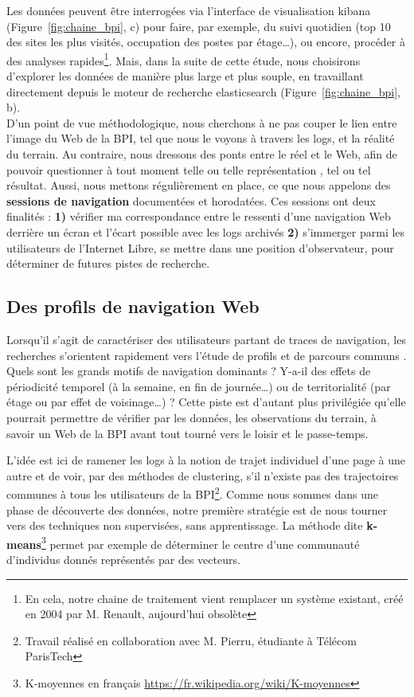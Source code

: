 \documentclass[symmetric,justified,marginals=raggedouter]{tufte-book}
\begin{document}
Les données peuvent être interrogées via l'interface de visualisation kibana (Figure~\ref{fig:chaine_bpi}, c) pour faire, par exemple, du suivi quotidien (top 10 des sites les plus visités, occupation des postes par étage\ldots{}), ou encore, procéder à des analyses rapides\footnote{\RaggedOuter En cela, notre chaine de traitement vient remplacer un système existant, créé en 2004 par M. Renault, aujourd'hui obsolète}. Mais, dans la suite de cette étude, nous choisirons d'explorer les données de manière plus large et plus souple, en travaillant directement depuis le moteur de recherche elasticsearch (Figure~\ref{fig:chaine_bpi}, b). \\

\noindent D'un point de vue méthodologique, nous cherchons à ne pas couper le lien entre l'image du Web de la BPI, tel que nous le voyons à travers les logs, et la réalité du terrain. Au contraire, nous dressons des ponts entre le réel et le Web, afin de pouvoir questionner à tout moment telle ou telle représentation , tel ou tel résultat. Aussi, nous mettons régulièrement en place, ce que nous appelons des \textbf{sessions de navigation} documentées et horodatées. Ces sessions ont deux finalités : \textbf{1)} vérifier ma correspondance entre le ressenti d'une navigation Web derrière un écran et l'écart possible avec les logs archivés \textbf{2)} s'immerger parmi les utilisateurs de l'Internet Libre, se mettre dans une position d'observateur, pour déterminer de futures pistes de recherche.

\subsection{Des profils de navigation Web} 

\noindent Lorsqu'il s'agit de caractériser des utilisateurs partant de traces de navigation, les recherches s'orientent rapidement vers l'étude de profils et de parcours communs \citep{feng_web_2006}. Quels sont les grands motifs de navigation dominants ? Y-a-il des effets de périodicité temporel (à la semaine, en fin de journée\ldots{}) ou de territorialité (par étage ou par effet de voisinage\ldots{}) ? Cette piste est d'autant plus privilégiée qu'elle pourrait permettre de vérifier par les données, les observations du terrain, à savoir un Web de la BPI avant tout tourné vers le loisir et le passe-temps.

L'idée est ici de ramener les logs à la notion de trajet individuel d'une page à une autre et de voir, par des méthodes de clustering, s'il n'existe pas des trajectoires communes à tous les utilisateurs de la BPI\footnote{\RaggedOuter Travail réalisé en collaboration avec M. Pierru, étudiante à Télécom ParisTech}. Comme nous sommes dans une phase de découverte des données, notre première stratégie est de nous tourner vers des techniques non supervisées, sans apprentissage. La méthode dite \textbf{k-means}\footnote{\RaggedOuter K-moyennes en français \url{https://fr.wikipedia.org/wiki/K-moyennes}} permet par exemple de déterminer le centre d'une communauté d'individus donnés représentés par des vecteurs.
\end{document}
